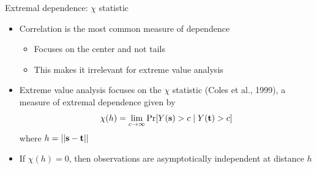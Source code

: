 \documentclass{beamer}
\begin{document}

 \begin{frame}{Extremal dependence: $\chi$ statistic}
   \begin{itemize} \setlength{\itemsep}{1em}
     \item Correlation is the most common measure of dependence
     \begin{itemize}
       \item Focuses on the center and not tails
       \item This makes it irrelevant for extreme value analysis
     \end{itemize}
     \item Extreme value analysis focuses on the $\chi$ statistic (Coles et al., 1999), a measure of extremal dependence given by
     \begin{align*}
       \chi(h) = \lim_{c \rightarrow \infty}\Pr[Y(\mathbf{s}) > c \mid Y(\mathbf{t}) > c]
     \end{align*}
     where $h = ||\mathbf{s} - \mathbf{t}||$
     \item If $ \chi(h) = 0$, then observations are asymptotically independent at distance $h$
   \end{itemize}
 \end{frame}
\end{document}
